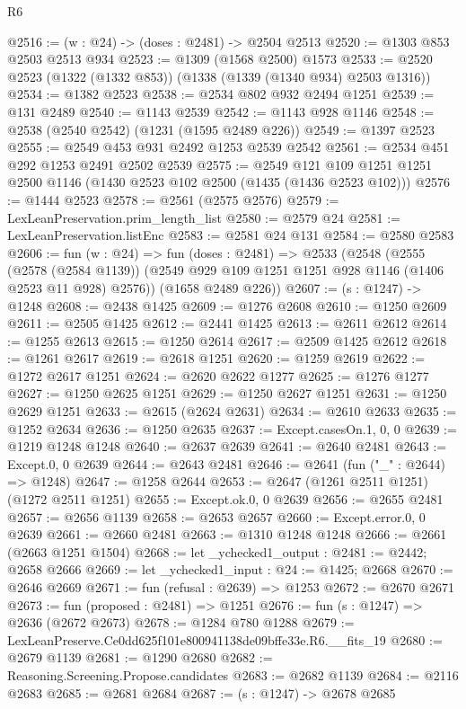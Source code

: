 \begin{lexlean}{R6}
\begin{coremodule}
@2516 := (w : @24) -> (doses : @2481) -> @2504 @2513
@2520 := @1303 @853 @2503 @2513 @934
@2523 := @1309 (@1568 @2500) @1573
@2533 := @2520 @2523 (@1322 (@1332 @853)) (@1338 (@1339 (@1340 @934) @2503 @1316))
@2534 := @1382 @2523
@2538 := @2534 @802 @932 @2494 @1251
@2539 := @131 @2489
@2540 := @1143 @2539
@2542 := @1143 @928 @1146
@2548 := @2538 (@2540 @2542) (@1231 (@1595 @2489 @226))
@2549 := @1397 @2523
@2555 := @2549 @453 @931 @2492 @1253 @2539 @2542
@2561 := @2534 @451 @292 @1253 @2491 @2502 @2539
@2575 := @2549 @121 @109 @1251 @1251 @2500 @1146 (@1430 @2523 @102 @2500 (@1435 (@1436 @2523 @102)))
@2576 := @1444 @2523
@2578 := @2561 (@2575 @2576)
@2579 := LexLeanPreservation.prim_length_list
@2580 := @2579 @24
@2581 := LexLeanPreservation.listEnc
@2583 := @2581 @24 @131
@2584 := @2580 @2583
@2606 := fun (w : @24) =>
  fun (doses : @2481) =>
  @2533
    (@2548
      (@2555
        (@2578 (@2584 @1139))
        (@2549 @929 @109 @1251 @1251 @928 @1146 (@1406 @2523 @11 @928) @2576))
      (@1658 @2489 @226))
@2607 := (s : @1247) -> @1248
@2608 := @2438 @1425
@2609 := @1276 @2608
@2610 := @1250 @2609
@2611 := @2505 @1425
@2612 := @2441 @1425
@2613 := @2611 @2612
@2614 := @1255 @2613
@2615 := @1250 @2614
@2617 := @2509 @1425 @2612
@2618 := @1261 @2617
@2619 := @2618 @1251
@2620 := @1259 @2619
@2622 := @1272 @2617 @1251
@2624 := @2620 @2622 @1277
@2625 := @1276 @1277
@2627 := @1250 @2625 @1251
@2629 := @1250 @2627 @1251
@2631 := @1250 @2629 @1251
@2633 := @2615 (@2624 @2631)
@2634 := @2610 @2633
@2635 := @1252 @2634
@2636 := @1250 @2635
@2637 := Except.casesOn.{1, 0, 0}
@2639 := @1219 @1248 @1248
@2640 := @2637 @2639
@2641 := @2640 @2481
@2643 := Except.{0, 0} @2639
@2644 := @2643 @2481
@2646 := @2641 (fun ("_" : @2644) => @1248)
@2647 := @1258 @2644
@2653 := @2647 (@1261 @2511 @1251) (@1272 @2511 @1251)
@2655 := Except.ok.{0, 0} @2639
@2656 := @2655 @2481
@2657 := @2656 @1139
@2658 := @2653 @2657
@2660 := Except.error.{0, 0} @2639
@2661 := @2660 @2481
@2663 := @1310 @1248 @1248
@2666 := @2661 (@2663 @1251 @1504)
@2668 := let _ychecked1_output : @2481 := @2442; @2658 @2666
@2669 := let _ychecked1_input : @24 := @1425; @2668
@2670 := @2646 @2669
@2671 := fun (refusal : @2639) => @1253
@2672 := @2670 @2671
@2673 := fun (proposed : @2481) => @1251
@2676 := fun (s : @1247) => @2636 (@2672 @2673)
@2678 := @1284 @780 @1288
@2679 := LexLeanPreserve.Ce0dd625f101e800941138de09bffe33e.R6.__fits_19
@2680 := @2679 @1139
@2681 := @1290 @2680
@2682 := Reasoning.Screening.Propose.candidates
@2683 := @2682 @1139
@2684 := @2116 @2683
@2685 := @2681 @2684
@2687 := (s : @1247) -> @2678 @2685

\end{coremodule}
\end{lexlean}
